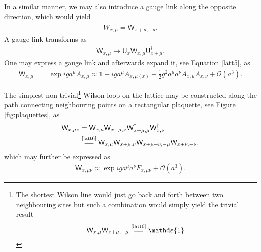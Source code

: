 \begin{remark}
In a similar manner, we may also introduce a gauge link along the opposite direction, which would yield
\begin{align}\label{latt6}
    W_{x,\mu}^{\dagger}=\textsf{W}_{x+\mu,-\mu}.
\end{align}
A gauge link transforms as
\begin{align*}
    \textsf{W}_{x, \mu} \rightarrow \textsf{U}_{x} \textsf{W}_{x, \mu} \textsf{U}_{x+\mu}^{\dagger}.
\end{align*}
One may express a gauge link and afterwards expand it, see Equation \cref{latt5}, as
\begin{equation*}
    \begin{aligned}
     \textsf{W}_{x,\mu}&=\exp{iga^\mu A_{x,\mu}}\approx \mathds{1}+iga^\mu A_{x,\mu(x)}-\frac{1}{2}g^2a^\mu a^\nu A_{x,\mu}A_
     {x,\nu}+\mathcal{O}(a^3).
\end{aligned}
\end{equation*}
\end{remark}

The simplest non-trivial\footnote{The shortest Wilson line would just go back and forth between two neighbouring sites but such a combination would simply yield the trivial result
\begin{align*}
    \textsf{W}_{x,\mu}\textsf{W}_{x+\mu,-\mu}\stackrel{\text{\cref{latt6}}}{=\joinrel=}\mathds{1}.
\end{align*}
} Wilson loop on the lattice may be constructed along the path connecting neighbouring points on a rectangular {\sffamily\color{maincolor}plaquette}, see Figure \cref{fig:plaquettes}, as
\begin{align*}
    \textsf{W}_{x, \mu \nu}&=\textsf{W}_{x, \mu} \textsf{W}_{x+\mu, \nu} \textsf{W}^\dagger_{x+\mu,\mu}\textsf{W}^\dagger_{x,\nu}\\
    &\stackrel{\text{\cref{latt6}}}{=\joinrel=}\textsf{W}_{x, \mu} \textsf{W}_{x+\mu, \nu} \textsf{W}_{x+\mu+\nu,-\mu} \textsf{W}_{x+\nu,-\nu},
\end{align*}
which may further be expressed as
\begin{align*}
    \textsf{W}_{x, \mu \nu} \approx \exp{ig a^{\mu} a^{\nu} F_{x,\mu \nu}+\mathcal{O}\left(a^{3}\right)}.
\end{align*}

